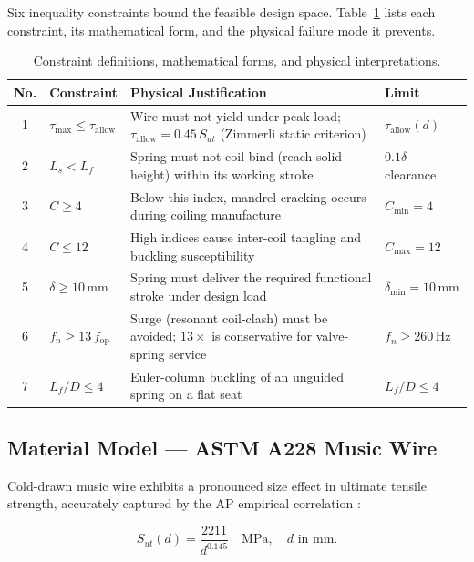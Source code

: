 \documentclass[10pt,twocolumn]{article}
\begin{document}
Six inequality constraints bound the feasible design space.
Table~\ref{tab:con} lists each constraint, its mathematical form, and the
physical failure mode it prevents.

\begin{table}[!ht]
  \centering
  \caption{Constraint definitions, mathematical forms, and physical interpretations.}
  \label{tab:con}
  \small
  \begin{tabularx}{\textwidth}{@{}clXl@{}}
    \toprule
    No. & Constraint & Physical Justification & Limit \\
    \midrule
    1 & $\tau_{\max} \le \tau_{\text{allow}}$
      & Wire must not yield under peak load; $\tau_{\text{allow}} = 0.45\,S_{ut}$
        (Zimmerli static criterion)
      & $\tau_{\text{allow}}(d)$ \\
    2 & $L_s < L_f$
      & Spring must not coil-bind (reach solid height) within its working stroke
      & $0.1\delta$ clearance \\
    3 & $C \ge 4$
      & Below this index, mandrel cracking occurs during coiling manufacture
      & $C_{\min} = 4$ \\
    4 & $C \le 12$
      & High indices cause inter-coil tangling and buckling susceptibility
      & $C_{\max} = 12$ \\
    5 & $\delta \ge 10\,\mathrm{mm}$
      & Spring must deliver the required functional stroke under design load
      & $\delta_{\min} = 10\,\mathrm{mm}$ \\
    6 & $f_n \ge 13\,f_{\text{op}}$
      & Surge (resonant coil-clash) must be avoided; $13\times$ is
        conservative for valve-spring service
      & $f_n \ge 260\,\mathrm{Hz}$ \\
    7 & $L_f/D \le 4$
      & Euler-column buckling of an unguided spring on a flat seat
      & $L_f/D \le 4$ \\
    \bottomrule
  \end{tabularx}
\end{table}

\subsection{Material Model --- ASTM A228 Music Wire}

Cold-drawn music wire exhibits a pronounced size effect in ultimate tensile
strength, accurately captured by the AP empirical correlation \cite{shigley2014}:

\begin{equation}
  S_{ut}(d) = \frac{2211}{d^{0.145}} \quad \text{MPa},
  \quad d \text{ in mm.}
  \label{eq:sut}
\end{equation}
\end{document}
